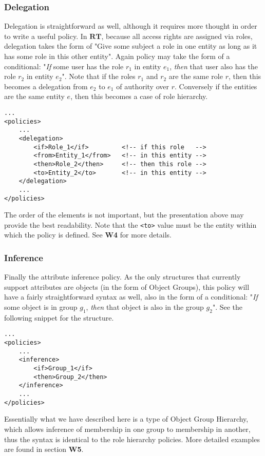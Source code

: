\documentclass{article}
\providecommand{\inlinecode}{\texttt}
\providecommand{\RT}{\textbf{RT}}
\begin{document}
\subsubsection{Delegation}
Delegation is straightforward as well, although it requires more thought in order to write a useful policy. In $\RT$, because all access rights are assigned via roles, delegation takes the form of "Give some subject a role in one entity as long as it has some role in this other entity".
Again policy may take the form of a conditional: "\textit{If} some user has the role $r_1$ in entity $e_1$, \textit{then} that user also has the role $r_2$ in entity $e_2$".
Note that if the roles $r_1$ and $r_2$ are the same role $r$, then this becomes a delegation from $e_2$ to $e_1$ of authority over $r$. Conversely if the entities are the same entity $e$, then this becomes a case of role hierarchy.

\begin{lstlisting}
...
<policies>
    ...
    <delegation>
        <if>Role_1</if>         <!-- if this role   -->
        <from>Entity_1</from>   <!-- in this entity -->
        <then>Role_2</then>     <!-- then this role -->
        <to>Entity_2</to>       <!-- in this entity -->
    </delegation>
    ...
</policies>
\end{lstlisting}
The order of the elements is not important, but the presentation above may provide the best readability. Note that the \inlinecode{<to>} value must be the entity within which the policy is defined. See \textbf{W4} for more details.

\subsubsection{Inference}
Finally the attribute inference policy. As the only structures that currently support attributes are objects (in the form of Object Groups), this policy will have a fairly straightforward syntax as well, also in the form of a conditional: "\textit{If} some object is in group $g_1$, \textit{then} that object is also in the group $g_2$". See the following snippet for the structure.
\begin{lstlisting}
...
<policies>
    ...
    <inference>
        <if>Group_1</if>
        <then>Group_2</then>
    </inference>
    ...
</policies>
\end{lstlisting}
Essentially what we have described here is a type of Object Group Hierarchy, which allows inference of membership in one group to membership in another, thus the syntax is identical to the role hierarchy policies. More detailed examples are found in section \textbf{W5}.
\end{document}
